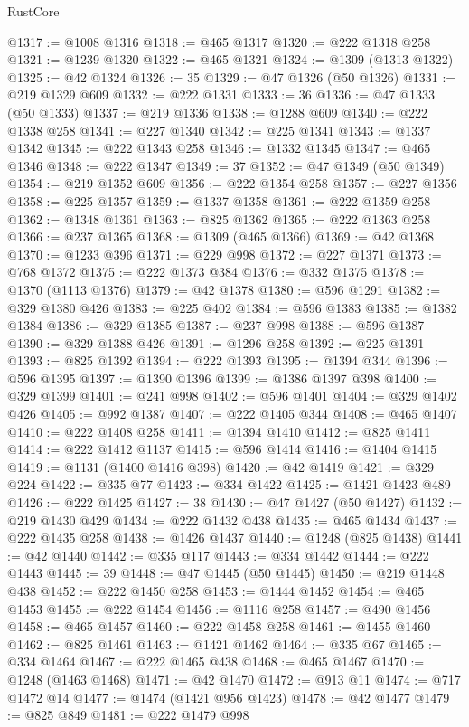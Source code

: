 \begin{lexlean}{RustCore}
\begin{coremodule}
@1317 := @1008 @1316
@1318 := @465 @1317
@1320 := @222 @1318 @258
@1321 := @1239 @1320
@1322 := @465 @1321
@1324 := @1309 (@1313 @1322)
@1325 := @42 @1324
@1326 := 35
@1329 := @47 @1326 (@50 @1326)
@1331 := @219 @1329 @609
@1332 := @222 @1331
@1333 := 36
@1336 := @47 @1333 (@50 @1333)
@1337 := @219 @1336
@1338 := @1288 @609
@1340 := @222 @1338 @258
@1341 := @227 @1340
@1342 := @225 @1341
@1343 := @1337 @1342
@1345 := @222 @1343 @258
@1346 := @1332 @1345
@1347 := @465 @1346
@1348 := @222 @1347
@1349 := 37
@1352 := @47 @1349 (@50 @1349)
@1354 := @219 @1352 @609
@1356 := @222 @1354 @258
@1357 := @227 @1356
@1358 := @225 @1357
@1359 := @1337 @1358
@1361 := @222 @1359 @258
@1362 := @1348 @1361
@1363 := @825 @1362
@1365 := @222 @1363 @258
@1366 := @237 @1365
@1368 := @1309 (@465 @1366)
@1369 := @42 @1368
@1370 := @1233 @396
@1371 := @229 @998
@1372 := @227 @1371
@1373 := @768 @1372
@1375 := @222 @1373 @384
@1376 := @332 @1375
@1378 := @1370 (@1113 @1376)
@1379 := @42 @1378
@1380 := @596 @1291
@1382 := @329 @1380 @426
@1383 := @225 @402
@1384 := @596 @1383
@1385 := @1382 @1384
@1386 := @329 @1385
@1387 := @237 @998
@1388 := @596 @1387
@1390 := @329 @1388 @426
@1391 := @1296 @258
@1392 := @225 @1391
@1393 := @825 @1392
@1394 := @222 @1393
@1395 := @1394 @344
@1396 := @596 @1395
@1397 := @1390 @1396
@1399 := @1386 @1397 @398
@1400 := @329 @1399
@1401 := @241 @998
@1402 := @596 @1401
@1404 := @329 @1402 @426
@1405 := @992 @1387
@1407 := @222 @1405 @344
@1408 := @465 @1407
@1410 := @222 @1408 @258
@1411 := @1394 @1410
@1412 := @825 @1411
@1414 := @222 @1412 @1137
@1415 := @596 @1414
@1416 := @1404 @1415
@1419 := @1131 (@1400 @1416 @398)
@1420 := @42 @1419
@1421 := @329 @224
@1422 := @335 @77
@1423 := @334 @1422
@1425 := @1421 @1423 @489
@1426 := @222 @1425
@1427 := 38
@1430 := @47 @1427 (@50 @1427)
@1432 := @219 @1430 @429
@1434 := @222 @1432 @438
@1435 := @465 @1434
@1437 := @222 @1435 @258
@1438 := @1426 @1437
@1440 := @1248 (@825 @1438)
@1441 := @42 @1440
@1442 := @335 @117
@1443 := @334 @1442
@1444 := @222 @1443
@1445 := 39
@1448 := @47 @1445 (@50 @1445)
@1450 := @219 @1448 @438
@1452 := @222 @1450 @258
@1453 := @1444 @1452
@1454 := @465 @1453
@1455 := @222 @1454
@1456 := @1116 @258
@1457 := @490 @1456
@1458 := @465 @1457
@1460 := @222 @1458 @258
@1461 := @1455 @1460
@1462 := @825 @1461
@1463 := @1421 @1462
@1464 := @335 @67
@1465 := @334 @1464
@1467 := @222 @1465 @438
@1468 := @465 @1467
@1470 := @1248 (@1463 @1468)
@1471 := @42 @1470
@1472 := @913 @11
@1474 := @717 @1472 @14
@1477 := @1474 (@1421 @956 @1423)
@1478 := @42 @1477
@1479 := @825 @849
@1481 := @222 @1479 @998

\end{coremodule}
\end{lexlean}
